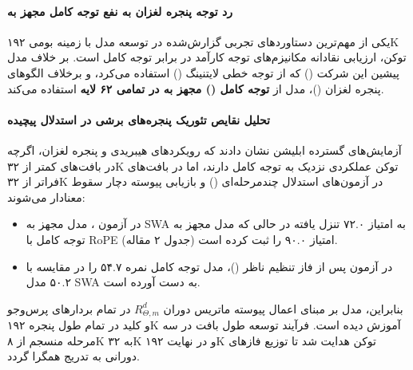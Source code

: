 \item {}

\paragraph*{رد توجه پنجره لغزان به نفع توجه کامل مجهز به }
یکی از مهم‌ترین دستاوردهای تجربی گزارش‌شده در توسعه مدل  \cite{minimax2026m2} با زمینه بومی ۱۹۲K توکن، ارزیابی نقادانه مکانیزم‌های توجه کارآمد در برابر توجه کامل است. بر خلاف مدل پیشین این شرکت () که از توجه خطی لایتنینگ () استفاده می‌کرد، و برخلاف الگوهای پنجره لغزان ()، مدل  از \textbf{توجه کامل () مجهز به  در تمامی ۶۲ لایه} استفاده می‌کند.

\paragraph*{تحلیل نقایص تئوریک پنجره‌های برشی در استدلال پیچیده}
آزمایش‌های گسترده ابلیشن نشان دادند که رویکردهای هیبریدی و پنجره لغزان، اگرچه در بافت‌های کمتر از ۳۲K توکن عملکردی نزدیک به توجه کامل دارند، اما در بافت‌های فراتر از ۳۲K در آزمون‌های استدلال چندمرحله‌ای () و بازیابی پیوسته دچار سقوط معنادار می‌شوند:
\begin{itemize}
    \item در آزمون ، مدل مجهز به SWA به امتیاز ۷۲.۰ تنزل یافته در حالی که مدل مجهز به توجه کامل با RoPE امتیاز ۹۰.۰ را ثبت کرده است (جدول ۲ مقاله).
    \item در آزمون  پس از فاز تنظیم ناظر ()، مدل توجه کامل نمره ۵۴.۷ را در مقایسه با ۵۰.۲ مدل SWA به دست آورده است.
\end{itemize}
بنابراین، مدل بر مبنای اعمال پیوسته ماتریس دوران $R_{\Theta, m}^d$ در تمام بردارهای پرس‌وجو و کلید در تمام طول پنجره ۱۹۲K آموزش دیده است. فرآیند توسعه طول بافت در سه مرحله منسجم از ۸K به ۳۲K و در نهایت ۱۹۲K توکن هدایت شد تا توزیع فازهای دورانی به تدریج همگرا گردد.